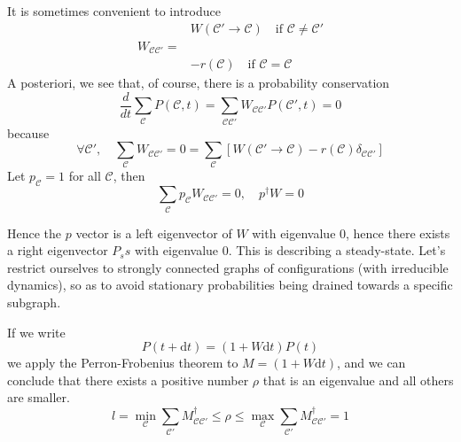 \documentclass[a4paper]{book}
\theoremstyle{definition}
\theoremstyle{remark}
\begin{document}
It is sometimes convenient to introduce 
\begin{equation}
    \begin{aligned}
        &W(\mathscr{C}' \rightarrow \mathscr{C}) \quad \text{if } \mathscr{C} \neq \mathscr{C}' \\ 
        W_{\mathscr{C}\mathscr{C}'} =&\\
        &-r(\mathscr{C}) \quad \text{if }\mathscr{C} = \mathscr{C}
    \end{aligned}
\end{equation}
A posteriori, we see that, of course, there is a probability conservation 
\begin{equation}
    \frac{d}{dt}\sum_{\mathscr{C}}P(\mathscr{C}, t) = \sum_{\mathscr{C}\mathscr{C}'}W_{\mathscr{C}\mathscr{C}'} P(\mathscr{C}', t) = 0
\end{equation}
because 
\begin{equation}
    \forall \mathscr{C}', \quad \sum_\mathscr{C} W_{\mathscr{C}\mathscr{C}'} = 0 = \sum_{\mathscr{C}}\left[W(\mathscr{C}'\rightarrow \mathscr{C}) - r(\mathscr{C})\delta_{\mathscr{C}\mathscr{C}'}\right]
\end{equation}
Let $p_\mathscr{C} = 1$ for all $\mathscr{C}$, then 
\begin{equation}
    \sum_\mathscr{C} p_\mathscr{C} W_{\mathscr{C}\mathscr{C}'} = 0, \quad p^\dagger W = 0
\end{equation}

Hence the $p$ vector is a left eigenvector of $W$ with eigenvalue 0, hence there exists a right eigenvector $P_ss$ with eigenvalue 0. This is describing a steady-state. Let's restrict ourselves to strongly connected graphs of configurations (with irreducible dynamics), so as to avoid stationary probabilities being drained towards a specific subgraph. \par \medskip 

If we write 
\begin{equation}
    P(t + \text{d}t) = (1 + W\text{d}t)P(t)
\end{equation}
we apply the Perron-Frobenius theorem to $M = (1 + W\text{d}t)$, and we can conclude that there exists a positive  number $\rho$ that is an eigenvalue and all others are smaller. 
\begin{equation}
    l = \min_{\mathscr{C}} \sum_{\mathscr{C}'} M^\dagger_{\mathscr{C}\mathscr{C}'} \leq \rho \leq \max_{\mathscr{C}} \sum_{\mathscr{C}'}M^\dagger_{\mathscr{C}\mathscr{C}'} = 1
\end{equation}
\end{document}
